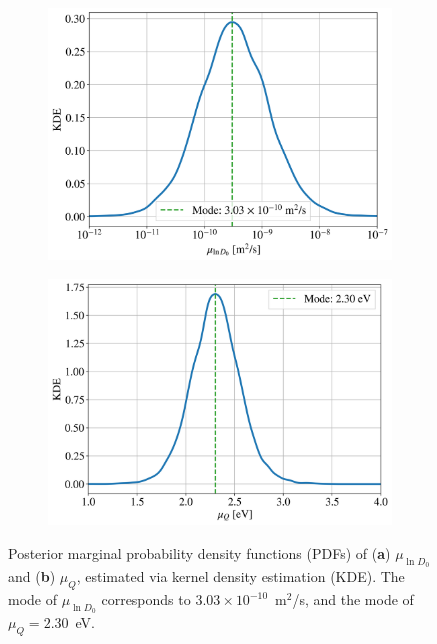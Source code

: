 \documentclass[%
preprint,
amsmath,amssymb,
aps,
]{revtex4-2}
\newcommand{\?}{\stackrel{?}{=}}
\begin{document}
\begin{figure}[h!]
\centering
\begin{subfigure}[b]{0.48\textwidth}
 \includegraphics[width=\textwidth]{KDE_D0_eff.png}
 \caption{}
 \label{Fig:KDE_D0}
\end{subfigure}
\hfill
\begin{subfigure}[b]{0.48\textwidth}
 \includegraphics[width=\textwidth]{KDE_Q_eff.png}
 \caption{}
 \label{Fig:KDE_Q}
\end{subfigure}
\caption{Posterior marginal probability density functions (PDFs) of (\textbf{a}) $\mu_{\ln D_{0}}$ and (\textbf{b}) $\mu_{Q}$, estimated via kernel density estimation (KDE). The mode of $\mu_{\ln D_{0}}$ corresponds to $3.03 \times 10^{-10}$~m$^2$/s, and the mode of $\mu_Q = 2.30$~eV.}
\end{figure}
\end{document}
